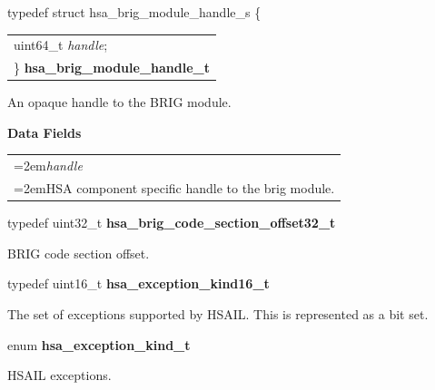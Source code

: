 \documentclass[final]{book}
\newcommand{\reffld}[1]{\textit{#1}}
\begin{document}
\begin{appendices}
\noindent\begin{tcolorbox}[breakable,nobeforeafter,arc=0mm,colframe=white,colback=lightgray,left=0mm]
typedef struct  hsa_brig_module_handle_s \{
\vspace{-3.5mm}\begin{longtable}{@{}p{\textwidth}}
\hspace{1.7em}uint64_t \reffld{handle};\\
\}  \hypertarget{group--FinalizerCoreApi-1gafaea8b9ab368c499b58375f02f4b178b}{\textbf{hsa_brig_module_handle_t}}
\end{longtable}

\end{tcolorbox}
An opaque handle to the BRIG module.

\noindent\textbf{Data Fields}\\[-6mm]
\begin{longtable}{@{}>{\hangindent=2em}p{\textwidth}}
\reffld{handle}\\\hspace{2em}HSA component specific handle to the brig module.
\end{longtable}



\noindent\begin{tcolorbox}[nobeforeafter,arc=0mm,colframe=white,colback=lightgray,left=0mm]
typedef uint32_t  \hypertarget{group--FinalizerCoreApi-1ga975ce5cee53438ed8dc078f3e1dfbc04}{\textbf{hsa_brig_code_section_offset32_t}}
\end{tcolorbox}
BRIG code section offset.
\\

\noindent\begin{tcolorbox}[nobeforeafter,arc=0mm,colframe=white,colback=lightgray,left=0mm]
typedef uint16_t  \hypertarget{group--FinalizerCoreApi-1ga79491dd37db36bb84058cccceea56fa7}{\textbf{hsa_exception_kind16_t}}
\end{tcolorbox}
The set of exceptions supported by HSAIL. This is represented as a bit set.
\\

\noindent\begin{tcolorbox}[nobeforeafter,arc=0mm,colframe=white,colback=lightgray,left=0mm]
enum \hypertarget{group--FinalizerCoreApi-1ga1bb9da9f1f4527de3a54d5fdc5d24ef1}{\textbf{hsa_exception_kind_t}}
\end{tcolorbox}
HSAIL exceptions.


\end{appendices}
\end{document}
